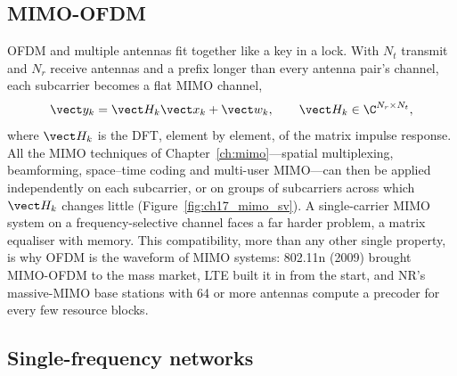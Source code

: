
\subsection{MIMO-OFDM}

OFDM and multiple antennas fit together like a key in a lock. With $N_t$ transmit and $N_r$ receive
antennas and a prefix longer than every antenna pair's channel, each subcarrier becomes a flat MIMO channel,
\begin{equation}
\vect y_k=\vect H_k\vect x_k+\vect w_k,\qquad \vect H_k\in\C^{N_r\times N_t},
\end{equation}
where $\vect H_k$ is the DFT, element by element, of the matrix impulse response. All the MIMO techniques of
Chapter~\ref{ch:mimo}---spatial multiplexing, beamforming, space--time coding and multi-user MIMO---can then be
applied independently on each subcarrier, or on groups of subcarriers across which $\vect H_k$ changes
little (Figure~\ref{fig:ch17_mimo_sv}). A single-carrier MIMO system on a frequency-selective channel faces a
far harder problem, a matrix equaliser with memory. This compatibility, more than any other single property, is
why OFDM is the waveform of MIMO systems: 802.11n (2009) brought MIMO-OFDM to the mass market, LTE built it in
from the start, and NR's massive-MIMO base stations with 64 or more antennas compute a precoder for every few
resource blocks.

\subsection{Single-frequency networks}


